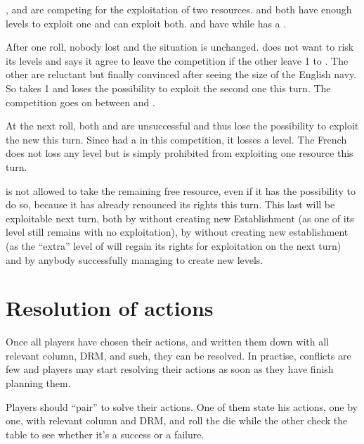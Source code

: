 \begin{exemple}\HOL, \ENG and \FRA are competing for the exploitation of
  two  resources. \HOL and \FRA both have enough levels to exploit
  one and \ANG can exploit both. \ANG and \HOL have \TP while \FRA has a \COL.

  After one roll, nobody lost and the situation is unchanged. \ANG does not
  want to risk its levels and says it agree to leave the competition if the
  other leave 1  to \ANG. The other are reluctant but finally
  convinced after seeing the size of the English navy. So \ANG takes 1
   and loses the possibility to exploit the second one this
  turn. The competition goes on between \FRA and \HOL.

  At the next roll, both \HOL and \FRA are unsuccessful and thus lose the
  possibility to exploit the new  this turn. Since \HOL had a \TP
  in this competition, it losses a level. The French \COL does not loss any
  level but is simply prohibited from exploiting one resource this turn.

  \ANG is not allowed to take the remaining free resource, even if it has the
  possibility to do so, because it has already renounced its rights this
  turn. This last  will be exploitable next turn, both by \ANG
  without creating new Establishment (as one of its level still remains with
  no exploitation), by \FRA without creating new establishment (as the
  ``extra'' level of \COL will regain its rights for exploitation on the next
  turn) and by anybody successfully managing to create new levels.
\end{exemple}

\section{Resolution of actions}\label{chAdministration:Resolution of actions}
\aparag Once all players have chosen their actions, and written them down with
all relevant column, DRM, and such, they can be resolved.
\bparag In practise, conflicts are few and players may start resolving their
actions as soon as they have finish planning them.

\begin{playtip}
  Players should ``pair'' to solve their actions. One of them state his
  actions, one by one, with relevant column and DRM, and roll the die while
  the other check the table to see whether it's a success or a failure.
\end{playtip}

